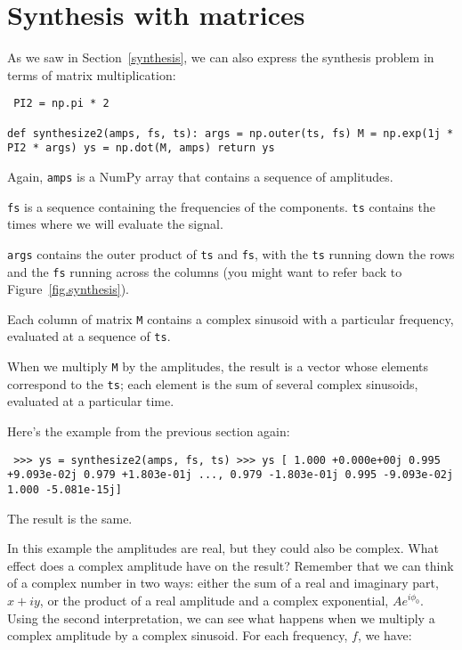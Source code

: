 \documentclass[12pt]{book} \usepackage[width=5.5in,height=8.5in, hmarginratio=3:2,vmarginratio=1:1]{geometry}
\begin{document}
\section{Synthesis with matrices} \label{synthmat} 

As we saw in Section~\ref{synthesis}, we can also express the synthesis problem in terms of matrix multiplication: 

\begin{verbatim} PI2 = np.pi * 2 

def synthesize2(amps, fs, ts): args = np.outer(ts, fs) M = np.exp(1j * PI2 * args) ys = np.dot(M, amps) return ys \end{verbatim} 

Again, {\tt amps} is a NumPy array that contains a sequence of amplitudes. 

{\tt fs} is a sequence containing the frequencies of the components. {\tt ts} contains the times where we will evaluate the signal. 

{\tt args} contains the outer product of {\tt ts} and {\tt fs}, with the {\tt ts} running down the rows and the {\tt fs} running across the columns (you might want to refer back to Figure~\ref{fig.synthesis}). 

Each column of matrix {\tt M} contains a complex sinusoid with a particular frequency, evaluated at a sequence of {\tt ts}. 

When we multiply {\tt M} by the amplitudes, the result is a vector whose elements correspond to the {\tt ts}; each element is the sum of several complex sinusoids, evaluated at a particular time. 

Here's the example from the previous section again: 

\begin{verbatim} >>> ys = synthesize2(amps, fs, ts) >>> ys [ 1.000 +0.000e+00j 0.995 +9.093e-02j 0.979 +1.803e-01j ..., 0.979 -1.803e-01j 0.995 -9.093e-02j 1.000 -5.081e-15j] \end{verbatim} 

The result is the same. 

In this example the amplitudes are real, but they could also be complex. What effect does a complex amplitude have on the result? Remember that we can think of a complex number in two ways: either the sum of a real and imaginary part, $x + i y$, or the product of a real amplitude and a complex exponential, $A e^{i \phi_0}$. Using the second interpretation, we can see what happens when we multiply a complex amplitude by a complex sinusoid. For each frequency, $f$, we have: 
\end{document}

